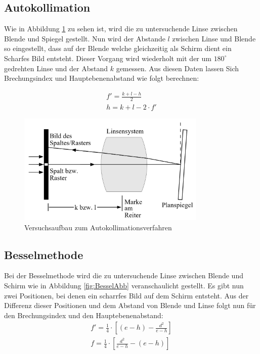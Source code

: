 \documentclass[11pt, a4paper]{article}
\begin{document}
    \subsection{Autokollimation}
    Wie in Abbildung \ref{fig:autoKollAbb} zu sehen ist, wird die zu untersuchende Linse zwischen Blende und Spiegel gestellt. Nun wird der Abstande $l$ zwischen 
    Linse und Blende so eingestellt, dass auf der Blende welche gleichzeitig als Schirm dient ein Scharfes Bild entsteht. Dieser Vorgang wird wiederholt mit der um $180^\circ$ gedrehten Linse und der Abstand $k$ gemessen.
    Aus diesen Daten lassen Sich Brechungsindex und Hauptebenenabstand wie folgt berechnen:

    \begin{align}
    f' = \frac{k+l-h}{2} \label{eq:autokollBrech}\\
    h = k + l - 2 \cdot f' \label{eq:autokollHaupt}
    \end{align}

    \begin{figure}
        \centering
        \includegraphics[width=0.8\textwidth]{Autokollimation_abb.png}
        \caption{Versuchsaufbau zum Autokollimationsverfahren \cite{OPA}}   %
        \label{fig:autoKollAbb}
    \end{figure}

    \subsection{Besselmethode}
    Bei der Besselmethode wird die zu untersuchende Linse zwischen Blende und Schirm wie in Abbildung \ref{fig:BesselAbb} veranschaulicht gestellt.
    Es gibt nun zwei Positionen, bei denen ein scharrfes Bild auf dem Schirm entsteht. Aus der Differenz dieser Positionen und dem Abstand von Blende und Linse folgt nun für den Brechungsindex und den Hauptebenenabstand:
    \begin{align}
        f' = \frac{1}{4} \cdot [(e-h)-\frac{d^2}{e-h}] \label{eq:besselBrech1}\\
        f = \frac{1}{4} \cdot [\frac{d^2}{e-h}-(e-h)] \label{eq:besselBrech2}
    \end{align}
    
\end{document}
